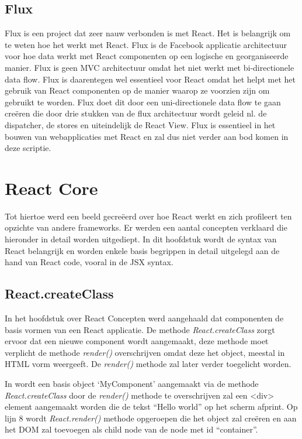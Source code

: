 	\subsection{Flux}
		
		Flux is een project dat zeer nauw verbonden is met React. Het is belangrijk om te weten hoe het werkt met React. Flux is de Facebook applicatie architectuur voor hoe data werkt met React componenten op een logische en georganiseerde manier. Flux is geen MVC architectuur omdat het niet werkt met bi-directionele data flow. Flux is daarentegen wel essentieel voor React omdat het helpt met het gebruik van React componenten op de manier waarop ze voorzien zijn om gebruikt te worden. Flux doet dit door een uni-directionele data flow te gaan creëren die door drie stukken van de flux architectuur wordt geleid nl. de dispatcher, de stores en uiteindelijk de React View. Flux is essentieel in het bouwen van webapplicaties met React en zal dus niet verder aan bod komen in deze scriptie.

\section{React Core}
	
	Tot hiertoe werd een beeld gecreëerd over hoe React werkt en zich profileert ten opzichte van andere frameworks. Er werden een aantal concepten verklaard die hieronder in detail worden uitgediept. In dit hoofdstuk wordt de syntax van React belangrijk en worden enkele basis begrippen in detail uitgelegd aan de hand van React code, vooral in de JSX syntax.
	
	\subsection{React.createClass}
		
		In het hoofdstuk over React Concepten werd aangehaald dat componenten de basis vormen van een React applicatie. De methode \emph{React.createClass} zorgt ervoor dat een nieuwe component wordt aangemaakt, deze methode moet verplicht de methode \emph{render()} overschrijven omdat deze het object, meestal in HTML vorm weergeeft. De \emph{render()} methode zal later verder toegelicht worden.
		
		
		In  wordt een basis object `MyComponent' aangemaakt via de methode \emph{React.createClass} door de \emph{render()} methode te overschrijven zal een <div> element aangemaakt worden die de tekst ``Hello world'' op het scherm afprint. Op lijn 8 wordt \emph{React.render()} methode opgeroepen die het object zal creëren en aan het DOM zal toevoegen als child node van de node met id ``container''.
		
